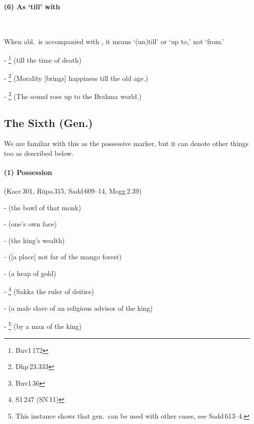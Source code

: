 \paragraph*{(6) As `till' with }\label{par:abltill} \ \par
When abl.\ is accompanied with , it means `(un)till' or `up to,' not `from.'\par
- \footnote{Buv1\,172} (till the time of death)\par
- \footnote{Dhp\,23.333} (Morality [brings] happiness till the old age.)\par
- \footnote{Buv1\,36} (The sound rose up to the Brahma world.)\par

{}
\subsection*{The Sixth  (Gen.)}

We are familiar with this as the possessive marker, but it can denote other things too as described below.

\paragraph*{(1) Possession} (Kacc\,301, R\=upa\,315, Sadd\,609--14, Mogg\,2.39)\par
-  (the bowl of that monk)\par
-  (one's own face)\par
-  (the king's wealth)\par
-  ([a place] not far of the mango forest)\par
-  (a heap of gold)\par
- \footnote{S1\,247 (SN\,11)} (Sakka the ruler of deities)\par
-  (a male slave of an religious advisor of the king)\par
- \footnote{This instance shows that gen.\ can be used with other cases, see Sadd\,613--4.} (by a man of the king)\par

